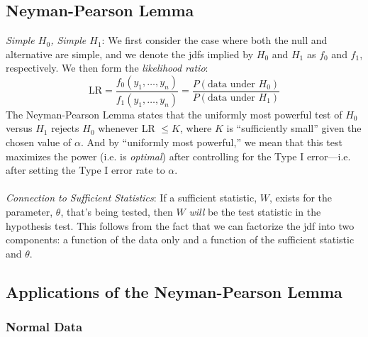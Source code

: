 \documentclass[a4paper,12pt]{scrartcl}
\begin{document}
\subsection{Neyman-Pearson Lemma}

{\sl Simple $H_0$, Simple $H_1$}: We first consider the case where
both the null and alternative are simple, and we denote the jdfs
implied by $H_0$ and $H_1$ as $f_0$ and $f_1$, respectively. We
then form the \emph{likelihood ratio}:
\[ \text{LR} = \frac{f_0(y_1, \ldots, y_n)}{f_1(y_1, \ldots, y_n)}=
   \frac{P(\text{data under $H_0$})}{P(\text{data under $H_1$})}
   \]
The Neyman-Pearson Lemma states that the uniformly most powerful
test of $H_0$ versus $H_1$ rejects $H_0$ whenever LR $\leq K$,
where $K$ is ``sufficiently small'' given the chosen value of $\alpha$.
And by ``uniformly most powerful,'' we mean that this test
maximizes the power (i.e. is \emph{optimal})
after controlling for the Type I error---i.e.
after setting the Type I error rate to $\alpha$.
\\
\\
{\sl Connection to Sufficient Statistics}: If a sufficient statistic,
$W$, exists for the parameter, $\theta$, that's being tested, then
$W$ \emph{will} be the test statistic in the hypothesis test. This
follows from the fact that we can factorize the jdf into two
components: a function of the data only and a function of the sufficient
statistic and $\theta$.

\subsection{Applications of the Neyman-Pearson Lemma}

\subsubsection{Normal Data}
\end{document}
